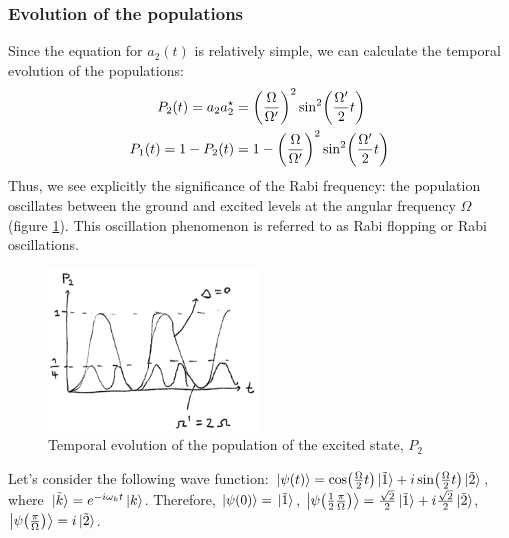 \subsubsection*{Evolution of the populations}
Since the equation for $a_{2}(t)$ is relatively simple, we can calculate the temporal evolution of the populations:
\begin{subequations}
\begin{align}
	P_{2}(t) = a_{2} a_{2}^{\star}{} &= \qty(\frac{\Omega}{\Omega'})^{2} \sin[2](\frac{\Omega'}{2} t) \\
	P_{1}(t) = 1 - P_{2}(t) &= 1 - \qty(\frac{\Omega}{\Omega'})^{2} \sin[2](\frac{\Omega'}{2} t)
\end{align}
\end{subequations}
Thus, we see explicitly the significance of the Rabi frequency: the population oscillates between the ground and excited levels at the angular frequency $\Omega$ (figure \ref{fig:rabi-population-p2}). This oscillation phenomenon is referred to as Rabi flopping or Rabi oscillations.
\begin{figure}[H]
	\centering
	\includegraphics[width=0.5\textwidth]{./images/3-rabi-population-p2}
	\caption{Temporal evolution of the population of the excited state, $P_{2}$}
	\label{fig:rabi-population-p2}
\end{figure}
\begin{example}
	Let's consider the following wave function: $\ket{\psi(t)} = \cos(\frac{\Omega}{2} t) \ket*{\tilde{1}} + i \sin(\frac{\Omega}{2} t) \ket*{\tilde{2}}$, where $\ket*{\tilde{k}} = e^{-i \omega_{k} t} \ket{k}$. Therefore, $\ket{\psi\qty(0)} = \ket*{\tilde{1}}$, $\ket{\psi\qty(\frac{1}{2}\frac{\pi}{\Omega})} = \frac{\sqrt{2}}{2} \ket*{\tilde{1}} + i \frac{\sqrt{2}}{2} \ket*{\tilde{2}}$, $\ket{\psi\qty(\frac{\pi}{\Omega})} = i \ket*{\tilde{2}}$.
\end{example}

